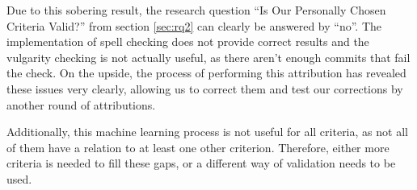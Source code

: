 Due to this sobering result, the research question ``Is Our Personally Chosen Criteria Valid?'' from section \ref{sec:rq2} can clearly be answered by ``no''. The implementation of spell checking does not provide correct results and the vulgarity checking is not actually useful, as there aren't enough commits that fail the check. On the upside, the process of performing this attribution has revealed these issues very clearly, allowing us to correct them and test our corrections by another round of attributions.

Additionally, this machine learning process is not useful for all criteria, as not all of them have a relation to at least one other criterion. Therefore, either more criteria is needed to fill these gaps, or a different way of validation needs to be used.


%
%
